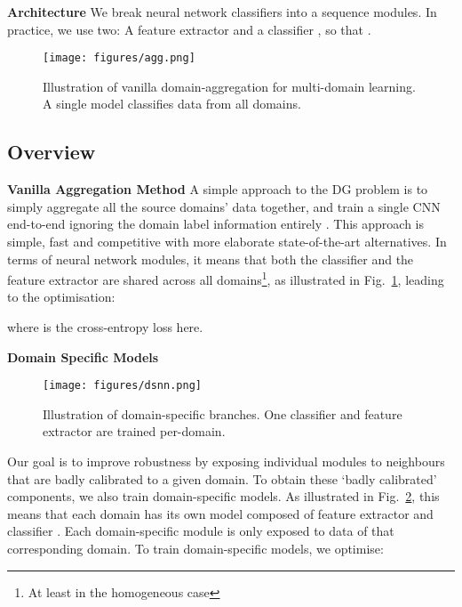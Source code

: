 \documentclass[10pt,twocolumn,letterpaper]{article}
\newcommand{\keypoint}[1]{\vspace{0.1cm}\noindent\textbf{#1}\quad}
\begin{document}
\keypoint{Architecture} We break neural network classifiers  into a sequence modules. In practice, we use two: A feature extractor  and a classifier , so that .

\begin{figure}[t]
\centering
\texttt{[image: figures/agg.png]}
\vspace{-0.4cm}
\caption{\small Illustration of vanilla domain-aggregation for multi-domain learning. A single model  classifies data from all domains.}
\label{fig-agg}
    \vspace{-0.3cm}
\end{figure}

\subsection{Overview}\label{sec:overview}
\keypoint{Vanilla Aggregation Method} 
A simple approach to the DG problem is to simply aggregate all the source domains' data together, and train a single CNN end-to-end ignoring the domain label information entirely \cite{Li2017dg}. This approach is simple, fast and competitive with more elaborate state-of-the-art alternatives. In terms of neural network modules, it means that both the classifier  and the feature extractor  are shared across all domains\footnote{At least in the homogeneous case}, as illustrated in Fig.~\ref{fig-agg}, leading to the optimisation:

where  is the cross-entropy loss here.




\keypoint{Domain Specific Models}
\begin{figure}[t]
\centering
\texttt{[image: figures/dsnn.png]}
\vspace{-0.4cm}
\caption{\small Illustration of domain-specific branches. One classifier and feature extractor are trained per-domain.}
\label{fig-dsnn}
    \vspace{-0.3cm}
\end{figure}
Our goal is to improve robustness by exposing individual modules to neighbours that are badly calibrated to a given domain. To obtain these `badly calibrated' components, we also train domain-specific models. As illustrated in Fig.~\ref{fig-dsnn}, this means that each domain  has its own model composed of feature extractor  and classifier . Each domain-specific module is only exposed to data of that corresponding domain. To train domain-specific models, we optimise:
\end{document}
